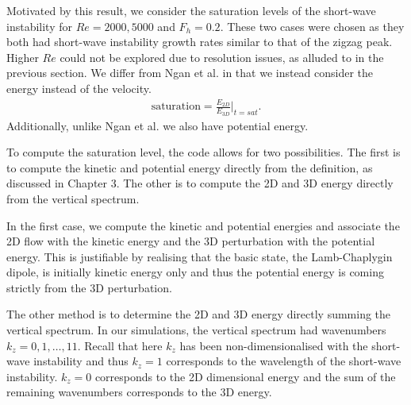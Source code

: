 Motivated by this result, we consider the saturation levels of the short-wave instability for $Re=2000,5000$ and $F_{h}=0.2$. These two cases were chosen as they both had short-wave instability growth rates similar to that of the zigzag peak. Higher $Re$ could not be explored due to resolution issues, as alluded to in the previous section. We differ from Ngan et al.\cite{ngan2005} in that we instead consider the energy instead of the velocity.\begin{align}
\text{saturation} = \frac{E_{2D}}{E_{3D}}\bigg|_{t=sat}.
\end{align}
Additionally, unlike Ngan et al.\cite{ngan2005} we also have potential energy.  

To compute the saturation level, the code allows for two possibilities. The first is to compute the kinetic and potential energy directly from the definition, as discussed in Chapter 3. The other is to compute the 2D and 3D energy directly from the vertical spectrum. 

In the first case, we compute the kinetic and potential energies and associate the 2D flow with the kinetic energy and the 3D perturbation with the potential energy. This is justifiable by realising that the basic state, the Lamb-Chaplygin dipole, is initially kinetic energy only and thus the potential energy is coming strictly from the 3D perturbation. 

The other method is to determine the 2D and 3D energy directly summing the vertical spectrum. In our simulations, the vertical spectrum had wavenumbers $k_{z}=0,1,\ldots,11$. Recall that here $k_{z}$ has been non-dimensionalised with the short-wave instability and thus $k_{z}=1$ corresponds to the wavelength of the short-wave instability. $k_{z}=0$ corresponds to the 2D dimensional energy and the sum of the remaining wavenumbers corresponds to the 3D energy. 

